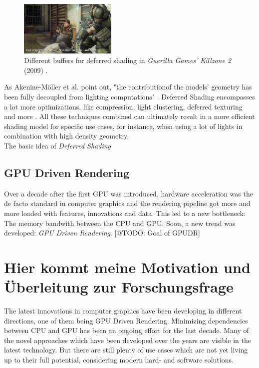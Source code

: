 \begin{figure}[h]
    \includegraphics[width=175px]{images/graphics/killzone-2-buffer-post.png}
    \caption{Different buffers for deferred shading in \emph{Guerilla Games'} \emph{Killzone 2} (2009) \cite{Valient2007}.}
    \label{fig:deferred-shading-buffers}
\end{figure}

\noindent
As Akenine-Möller et al. point out, "the contributionof the models’ geometry has been fully decoupled from lighting 
computations" \cite{AkenineMoeller2018}. Deferred Shading encompasses a lot more optimizations, like compression, 
light clustering, deferred texturing and more \cite{AkenineMoeller2018}. All these techniques combined can ultimately 
result in a more efficient shading model for specific use cases, for instance, when using a lot of lights in combination 
with high density geometry.\\

\noindent
The basic idea of \emph{Deferred Shading} 

\subsection{GPU Driven Rendering}

Over a decade after the first \ac{GPU} was introduced, hardware acceleration was the de facto standard in 
computer graphics and the rendering pipeline got more and more loaded with features, innovations and data. 
This led to a new bottleneck: The memory bandwith between the \ac{CPU} and \ac{GPU}. Soon, a new trend was 
developed: \emph{\ac{GPU} Driven Rendering}. [@TODO: Goal of GPUDR]

\section{Hier kommt meine Motivation und Überleitung zur Forschungsfrage}

The latest innovations in computer graphics have been developing in different directions,
one of them being \ac{GPU} Driven Rendering. Minimizing dependencies between \ac{CPU} and \ac{GPU} 
has been an ongoing effort for the last decade. Many of the novel approaches which have been developed 
over the years are visible in the latest technology. But there are still plenty of use cases 
which are not yet living up to their full potential, considering modern hard- and software solutions.\\

